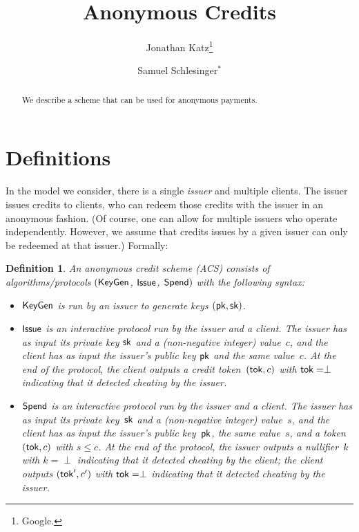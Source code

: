 \documentclass[11pt]{article}
\title{\textbf{Anonymous Credits}}
\author{{\sc Jonathan Katz}\thanks{Google.} \and {\sc Samuel Schlesinger}$^*$}
\date{}
\newtheorem{definition}{Definition}
\def\issue{{\sf Issue}}
\def\keygen{{\sf KeyGen}}
\def\pk{{\sf pk}}
\def\sk{{\sf sk}}
\def\tok{{\sf tok}}
\def\cred{{\tok}}
\def\spend{{\sf Spend}}
\begin{document}
\maketitle

\begin{abstract}
We describe a scheme that can be used for anonymous payments.
\end{abstract}

\section{Definitions}
\label{sec:definitions}
In the model we consider, there is a single \emph{issuer} and multiple {clients}. 
The issuer issues credits to clients, who can redeem those credits with the issuer in an anonymous fashion. 
(Of course, one can allow for multiple issuers who operate independently. 
However, we assume that credits issues by a given issuer can only be redeemed at that issuer.)
Formally:

\begin{definition}\label{def:creds}
An {\sf anonymous credit scheme} (ACS) consists of algorithms/protocols
$(\keygen$, $\issue$, $\spend)$ with the following syntax:
\begin{itemize}
    \item $\keygen$ is run by an issuer to generate keys $(\pk, \sk)$.
    \item $\issue$ is an interactive protocol run by the issuer and a client. The issuer has as input its private key $\sk$ and a (non-negative integer) value~$c$, and the client has as input the issuer's public key $\pk$ and the same value~$c$. At the end of the protocol, the client outputs a credit token~$(\tok, c)$ with  
    $\tok=\perp$ indicating that it detected cheating by the issuer.
    \item $\spend$ is an interactive protocol run by the issuer and a client. 
    The issuer has as input its private key~$\sk$ and a (non-negative integer) value~$s$, and the client has as input the issuer's public key~$\pk$, the same value~$s$, and a token $(\tok, c)$ with $s \leq c$. 
    At the end of the protocol, the issuer outputs a nullifier~$k$ with $k=\perp$ indicating that it detected cheating by the client; the client outputs $(\tok', c')$ with $\tok=\perp$ indicating that it detected cheating by the issuer.
\end{itemize}
\end{definition}
\end{document}
